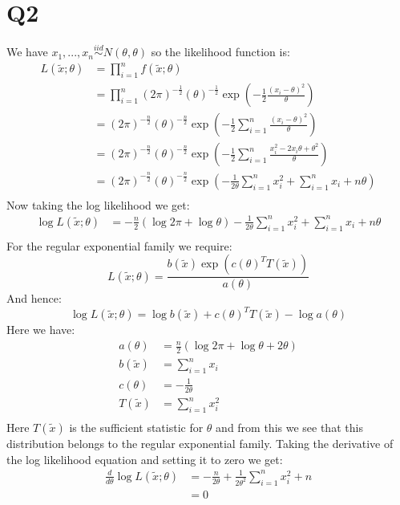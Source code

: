 \documentclass{article}
\begin{document}
\section*{Q2}
We have $x_1,...,x_n\stackrel{iid}{\sim}N(\theta,\theta)$ so the likelihood function is:
\begin{align*}
L(\tilde{x};\theta)&=\prod_{i=1}^{n}f(\tilde{x};\theta)\\
&=\prod_{i=1}^{n}(2\pi)^{-\frac{1}{2}}(\theta)^{-\frac{1}{2}}\exp\left(-\frac{1}{2}\frac{(x_i-\theta)^2}{\theta}\right)\\
&=(2\pi)^{-\frac{n}{2}}(\theta)^{-\frac{n}{2}}\exp\left(-\frac{1}{2}\sum_{i=1}^{n}\frac{(x_i-\theta)^2}{\theta}\right)\\
&=(2\pi)^{-\frac{n}{2}}(\theta)^{-\frac{n}{2}}\exp\left(-\frac{1}{2}\sum_{i=1}^{n}\frac{x_i^2-2x_i\theta+\theta^2}{\theta}\right)\\
&=(2\pi)^{-\frac{n}{2}}(\theta)^{-\frac{n}{2}}\exp\left(-\frac{1}{2\theta}\sum_{i=1}^{n}x_i^2+\sum_{i=1}^{n}x_i+n\theta\right)\\
\end{align*}
Now taking the log likelihood we get:
\begin{align*}
\log L(\tilde{x};\theta)&=-\frac{n}{2}\left(\log 2\pi +\log\theta\right)-\frac{1}{2\theta}\sum_{i=1}^{n}x_i^2+\sum_{i=1}^{n}x_i+n\theta\\
\end{align*}
For the regular exponential family we require:
$$L(\tilde{x};\theta)=\frac{b(\tilde{x})\exp(c(\theta)^TT(\tilde{x}))}{a(\theta)}$$
And hence:
$$\log L(\tilde{x};\theta)=\log b(\tilde{x})+c(\theta)^TT(\tilde{x})-\log a(\theta)$$
Here we have:
\begin{align*}
a(\theta)&=\frac{n}{2}(\log2\pi+\log\theta+2\theta)\\
b(\tilde{x})&=\sum_{i=1}^{n}x_i\\
c(\theta)&=-\frac{1}{2\theta}\\
T(\tilde{x})&=\sum_{i=1}^{n}x_i^2\\
\end{align*}
Here $T(\tilde{x})$ is the sufficient statistic for $\theta$ and from this we see that this distribution belongs to the regular exponential family.
\newline\newline
Taking the derivative of the log likelihood equation and setting it to zero  we get:
\begin{align*}
\frac{d}{d\theta} \log L(\tilde{x};\theta)&=-\frac{n}{2\theta}+\frac{1}{2\theta^2}\sum_{i=1}^{n}x_i^2+n\\
&=0\\
\end{align*}
\end{document}
